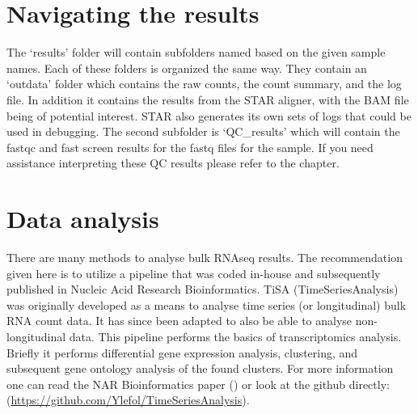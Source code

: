 \section{Navigating the results \label{sec:RNAseq_processing_results}}
The `results' folder will contain subfolders named based on the given sample names. Each of these folders is organized the same way. They contain an `outdata' folder which contains the raw counts, the count summary, and the log file. In addition it contains the results from the STAR aligner, with the BAM file being of potential interest. STAR also generates its own sets of logs that could be used in debugging. The second subfolder is `QC\_results' which will contain the fastqc \cite{fastqc} and fast screen \cite{fast_screen} results for the fastq files for the sample. If you need assistance interpreting these QC results please refer to the  chapter.


\section{Data analysis \label{sec:RNAdata_analysis}}
There are many methods to analyse bulk RNAseq results. The recommendation given here is to utilize a pipeline that was coded in-house and subsequently published in Nucleic Acid Research Bioinformatics. TiSA (TimeSeriesAnalysis) \cite{lefol2023tisa} was originally developed as a means to analyse time series (or longitudinal) bulk RNA count data. It has since been adapted to also be able to analyse non-longitudinal data. This pipeline performs the basics of transcriptomics analysis. Briefly it performs differential gene expression analysis, clustering, and subsequent gene ontology analysis of the found clusters. For more information one can read the NAR Bioinformatics paper (\cite{lefol2023tisa}) or look at the github directly: (\url{https://github.com/Ylefol/TimeSeriesAnalysis}).